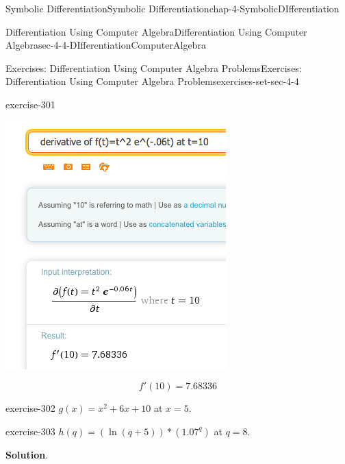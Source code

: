 \documentclass[oneside,10pt,]{book}
\numberwithin{equation}{section}
\begin{document}
\begin{chapterptx}{Symbolic Differentiation}{}{Symbolic Differentiation}{}{}{chap-4-SymbolicDIfferentiation}
\begin{sectionptx}{Differentiation Using Computer Algebra}{}{Differentiation Using Computer Algebra}{}{}{sec-4-4-DIfferentiationComputerAlgebra}
\begin{exercises-subsection-numberless}{Exercises: Differentiation Using Computer Algebra Problems}{}{Exercises: Differentiation Using Computer Algebra Problems}{}{}{exercises-set-sec-4-4}
\begin{divisionexercise}{13}{}{}{exercise-301}
\begin{sidebyside}{1}{0.3}{0.3}{0}
\begin{sbspanel}{0.4}
\includegraphics[width=1\linewidth]{images/sec4-4-sol13a.png}
\end{sbspanel}%
\end{sidebyside}%
%
\begin{equation*}
f' (10)=7.68336
\end{equation*}
\end{divisionexercise}%
\begin{divisionexercise}{14}{}{}{exercise-302}%
\hypertarget{p-1763}{}%
\(g(x)=x^2+6x+10\) at \(x=5\).%
\end{divisionexercise}%
\begin{divisionexercise}{15}{}{}{exercise-303}%
\hypertarget{p-1764}{}%
\(h(q)=(\ln(q+5) )*(1.07^q)\) at \(q=8\).%
\par\smallskip%
\noindent\textbf{Solution}.\hypertarget{solution-151}{}\quad%
\leavevmode%
\begin{sidebyside}{1}{0.25}{0.25}{0}%
\begin{sbspanel}{0.5}%

\end{sbspanel}
\end{sidebyside}
\end{divisionexercise}
\end{exercises-subsection-numberless}
\end{sectionptx}
\end{chapterptx}
\end{document}
